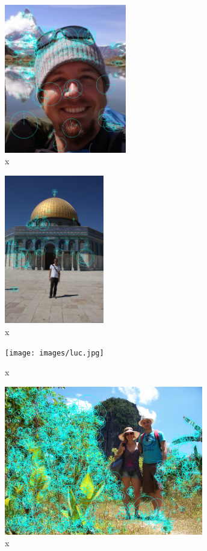 \documentclass[runningheads]{llncs}
\begin{document}
\begin{figure} \centering \includegraphics[height=6.5cm]{images/gass.jpg}
\caption{x} \label{fig:example} \end{figure}

\begin{figure} \centering \includegraphics[height=6.5cm]{images/gygli.jpg}
\caption{x} \label{fig:example} \end{figure}

\begin{figure} \centering \texttt{[image: images/luc.jpg]}
\caption{x} \label{fig:example} \end{figure}

\begin{figure} \centering \includegraphics[height=6.5cm]{images/manen.jpg}
\caption{x} \label{fig:example} \end{figure}
\end{document}
